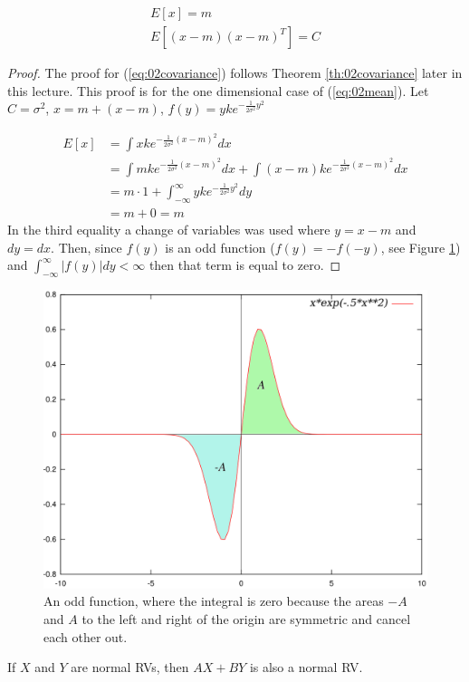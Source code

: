 \begin{theorem}
\label{th:02mean}
\begin{align}
\label{eq:02mean}
E[x] = m \\
\label{eq:02covariance}
E[(x-m)(x-m)^T] = C
\end{align}
\end{theorem}
\begin{proof}
The proof for (\ref{eq:02covariance}) follows Theorem \ref{th:02covariance} later in this lecture. This proof is for the one dimensional case of (\ref{eq:02mean}). Let $C=\sigma^2$, $x=m+(x-m)$, $f(y)=yke^{-\frac{1}{2\sigma^2}y^2}$

\begin{align*}
E[x] &= \int xke^{-\frac{1}{2\sigma^2}(x-m)^2}dx \\
&= \int mke^{-\frac{1}{2\sigma^2}(x-m)^2}dx + \int(x-m)ke^{-\frac{1}{2\sigma^2}(x-m)^2}dx \\
&= m \cdot 1 + \int_{-\infty}^\infty yke^{-\frac{1}{2\sigma^2}y^2}dy \\
&= m + 0 = m
\end{align*}
In the third equality a change of variables was used where $y=x-m$ and $dy=dx$. Then, since $f(y)$ is an odd function ($f(y)=-f(-y)$, see Figure \ref{fig:02oddFunction}) and $\int_{-\infty}^\infty|f(y)|dy < \infty$ then that term is equal to zero.
\end{proof}

\begin{figure}[ht!]
	\centering
	\includegraphics[width=.5\textwidth]{images/02oddFunction}
	\caption{An odd function, where the integral is zero because the areas $-A$ and $A$ to the left and right of the origin are symmetric and cancel each other out.}
	\label{fig:02oddFunction}
\end{figure}

\begin{theorem}
If $X$ and $Y$ are normal RVs, then $AX+BY$ is also a normal RV.
\end{theorem}

